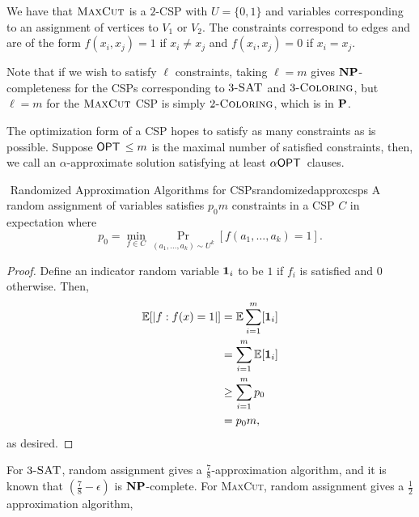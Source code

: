         \begin{example}
            We have that \(\textsc{MaxCut}\) is a \(2\)-CSP with \(U=\{0,1\}\) and variables corresponding to an assignment of vertices to \(V_1\) or \(V_2\). The constraints correspond to edges and are of the form \(f(x_i,x_j)=1\) if \(x_i\neq x_j\) and \(f(x_i,x_j)=0\) if \(x_i=x_j\).
        \end{example}
        \begin{remark*}
            Note that if we wish to satisfy \(\ell\) constraints, taking \(\ell=m\) gives \(\mathbf{NP}\)-completeness for the CSPs corresponding to \(3\textsc{-SAT}\) and \(3\textsc{-Coloring}\), but \(\ell=m\) for the \(\textsc{MaxCut}\) CSP is simply \(2\textsc{-Coloring}\), which is in \(\mathbf{P}\).
        \end{remark*}
        \begin{remark*}
            The optimization form of a CSP hopes to satisfy as many constraints as is possible. Suppose \(\mathsf{OPT\,}\leq m\) is the maximal number of satisfied constraints, then, we call an \(\alpha\)-approximate solution satisfying at least \(\alpha\mathsf{OPT\,}\) clauses.
        \end{remark*}
        \pagebreak
        \begin{theorem}{\Stop\,\,Randomized Approximation Algorithms for CSPs}{randomizedapproxcsps}
            A random assignment of variables satisfies \(p_0m\) constraints in a CSP \(C\) in expectation where
            \begin{equation*}
                p_0=\min_{f\in C}\Pr_{(a_1,\ldots,a_k)\sim U^k}[f(a_1,\ldots,a_k)=1].
            \end{equation*}
            \begin{proof}
                Define an indicator random variable \(\mathbf{1}_i\) to be \(1\) if \(f_i\) is satisfied and \(0\) otherwise. Then,
                \begin{align*}
                    \mathbb{E}[|f:f(x)=1|]&=\mathbb{E}\sum_{i=1}^m[\mathbf{1}_i] \\
                    &=\sum_{i=1}^m\mathbb{E}[\mathbf{1}_i] \\
                    &\geq \sum_{i=1}^m p_0 \\
                    &=p_0m,
                \end{align*}
                as desired.
            \end{proof}
        \end{theorem}
        \begin{remark*}
            For \(3\textsc{-SAT}\), random assignment gives a \(\frac{7}{8}\)-approximation algorithm, and it is known that \(\left(\frac{7}{8}-\epsilon\right)\) is \(\mathbf{NP}\)-complete. For \textsc{MaxCut}, random assignment gives a \(\frac{1}{2}\) approximation algorithm, 
        \end{remark*}